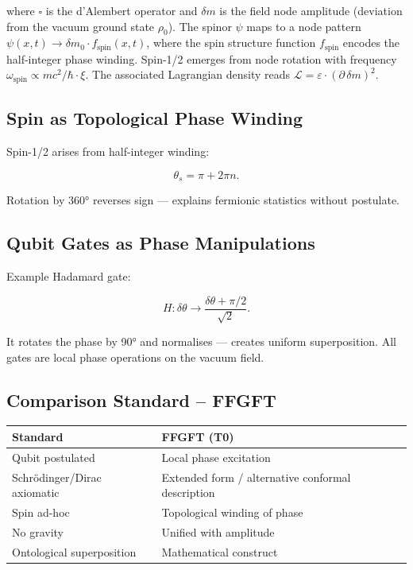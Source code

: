 	where \(\square\) is the d'Alembert operator and \(\delta m\) is the field node amplitude (deviation from the vacuum ground state \(\rho_0\)). The spinor \(\psi\) maps to a node pattern \(\psi(x,t) \to \delta m_0 \cdot f_{\text{spin}}(x,t)\), where the spin structure function \(f_{\text{spin}}\) encodes the half-integer phase winding. Spin-1/2 emerges from node rotation with frequency \(\omega_{\text{spin}} \propto m c^2 / \hbar \cdot \xi\). The associated Lagrangian density reads \(\mathcal{L} = \varepsilon \cdot (\partial \, \delta m)^2\).
	
	\subsection*{Spin as Topological Phase Winding}
	
	Spin-1/2 arises from half-integer winding:
	
	\begin{equation}
		\theta_s = \pi + 2\pi n.
	\end{equation}
	
	Rotation by 360° reverses sign — explains fermionic statistics without postulate.
	
	\subsection*{Qubit Gates as Phase Manipulations}
	
	Example Hadamard gate:
	
	\begin{equation}
		H: \delta \theta \to \frac{\delta \theta + \pi/2}{\sqrt{2}}.
	\end{equation}
	
	It rotates the phase by 90° and normalises — creates uniform superposition. All gates are local phase operations on the vacuum field.
	
	\subsection*{Comparison Standard – FFGFT}
	
	\begin{center}
		\begin{tabular}{p{}p{}}
			\textbf{Standard} & \textbf{FFGFT (T0)} \\
			\hline
			Qubit postulated & Local phase excitation \\
			Schrödinger/Dirac axiomatic & Extended form / alternative conformal description \\
			Spin ad-hoc & Topological winding of phase \\
			No gravity & Unified with amplitude \\
			Ontological superposition & Mathematical construct \\
		\end{tabular}
	\end{center}
	
